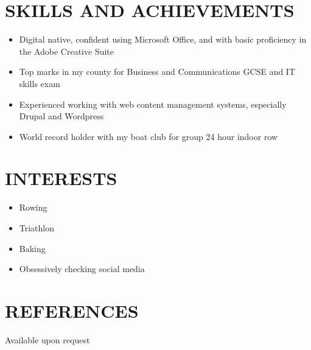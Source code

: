 \documentclass[]{friggeri-cv}
\begin{document}
\section{SKILLS AND ACHIEVEMENTS}

\begin{itemize}
	\item Digital native, confident using Microsoft Office, and with basic proficiency in the Adobe Creative Suite
	\item Top marks in my county for Business and Communications GCSE and IT skills exam
	\item Experienced working with web content management systems, especially Drupal and Wordpress
	\item World record holder with my boat club for group 24 hour indoor row
\end{itemize}

\section{INTERESTS}

\begin{itemize}
	\item Rowing
	\item Triathlon
	\item Baking
	\item Obsessively checking social media
\end{itemize}

\section{REFERENCES}

Available upon request
\end{document}
